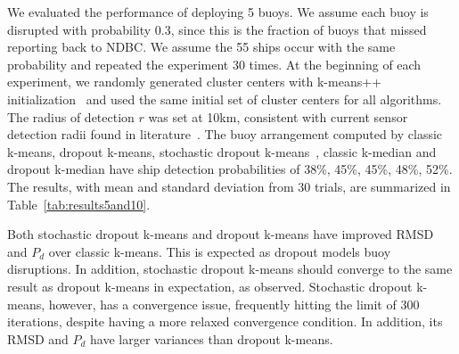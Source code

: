 \documentclass{article}
\begin{document}
We evaluated the performance of deploying 5 buoys. We assume each buoy is disrupted with probability 0.3, since this is the fraction of buoys that missed reporting back to NDBC. We assume the 55 ships occur with the same probability and repeated the experiment 30 times. At the beginning of each experiment, we randomly generated cluster centers with k-means++ initialization~\cite{arthur2007_kmeanspp} and used the same initial set of cluster centers for all algorithms. The radius of detection $r$ was set at 10km, consistent with current sensor detection radii found in literature~\cite{fefilatyev2012_buoycam,prasad2017_buoycam}. The buoy arrangement computed by classic k-means, dropout k-means, stochastic dropout k-means~\cite{zhang2016_dropoutkmeans}, classic k-median and dropout k-median have ship detection probabilities of 38\%, 45\%, 45\%, 48\%, 52\%. The results, with mean and standard deviation from 30 trials, are summarized in Table~\ref{tab:results5and10}.
\begin{table}[h]
\centering
\caption{Performance comparison with K=5 clusters} \label{tab:results5and10}
\end{table}

Both stochastic dropout k-means and dropout k-means have improved RMSD and $P_d$ over classic k-means. This is expected as dropout models buoy disruptions. In addition, stochastic dropout k-means should converge to the same result as dropout k-means in expectation, as observed. Stochastic dropout k-means, however, has a convergence issue, frequently hitting the limit of 300 iterations, despite having a more relaxed convergence condition. In addition, its RMSD and $P_d$ have larger variances than dropout k-means.
\end{document}
